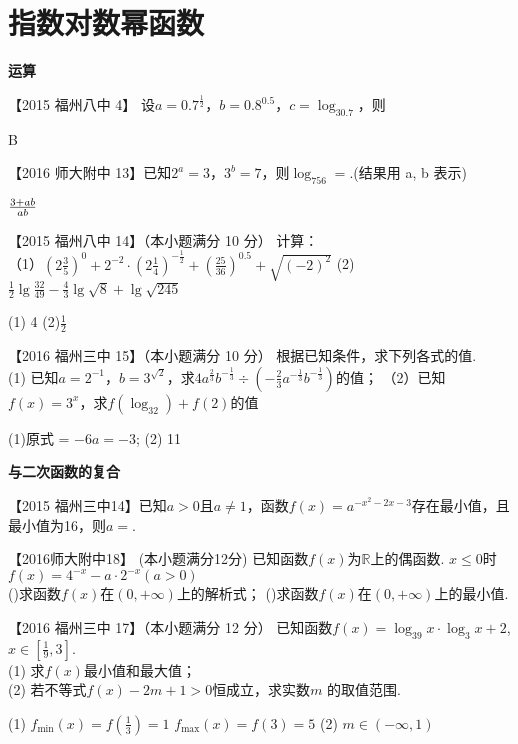 \section{指数对数幂函数}
\begin{exercise}{\large \bf 运\hspace{0.6em}算}
\item
【2015 福州八中 4】 设$a=0.7^{\frac12} $，$b=0.8^{0.5} $，$c=\log_30.7$，则\xz
{}
\begin{answer}
  B
\end{answer}
\item
【2016 师大附中 13】已知$2^a=3 $，$3^b=7$，则$\log_756= $\tk.(结果用 a, b 表示)
\begin{answer}
  $3+ab\over ab$
\end{answer}
\item
【2015 福州八中 14】（本小题满分 10 分）
计算：\\
（1）$\displaystyle (2\frac{3}{5})^0+2^{-2}\cdot(2\frac14)^{-\frac12}+(\frac{25}{36})^{0.5}+\sqrt{(-2)^2} $
\hspace{5em}
(2)$\displaystyle \frac12 \lg{\frac{32}{49}}-\frac43\lg{\sqrt 8}+\lg{\sqrt {245}} $
\begin{answer}
  (1) 4 (2)$\frac12$
\end{answer}
\vspace{12em}
\item
【2016 福州三中 15】（本小题满分 10 分） 根据已知条件，求下列各式的值.\\
(1) 已知$a=2^{-1}$，$b=3^{\sqrt2}$，求$4a^{\frac23}b^{-\frac13}\div(-\frac23a^{-\frac13}b^{-\frac13})$的值；
（2）已知$f(x)=3^x$，求$f(\log_32)+f(2)$的值
\begin{answer}
  (1)原式 = $-6a=-3$;
  (2) 11
\end{answer}
\vspace{9em}
\end{exercise}
\begin{exercise}{\bf 与二次函数的复合}
\item
【2015 福州三中14】已知$a>0$且$a\neq1$，函数$f(x)=a^{-x^2-2x-3}$存在最小值，且最小值为16，则$a=$\tk.\\
\item
【2016师大附中18】 (本小题满分12分)
已知函数$f(x)$为$\mathbb{R}$上的偶函数. $x\leq0$时$f(x)=4^{-x}-a\cdot 2^{-x}(a>0)$\\
()求函数$f(x)$在$(0,+\infty)$上的解析式；
()求函数$f(x)$在$(0,+\infty)$上的最小值.
\vspace{12em}
\item
【2016 福州三中 17】（本小题满分 12 分）
已知函数$f(x)=\log_39x\cdot\log_3x+2 $,$x\in[\frac19,3]$.\\
(1) 求$f(x)$最小值和最大值；\\
(2) 若不等式$f(x)-2m+1>0 $恒成立，求实数$m$ 的取值范围.
\begin{answer}
  (1) $f_{\min}(x)=f(\frac13)=1$
        $f_{\max}(x)=f(3)=5$
  (2) $m\in(-\infty,1)$
\end{answer}
\vspace{14em}
\end{exercise}
